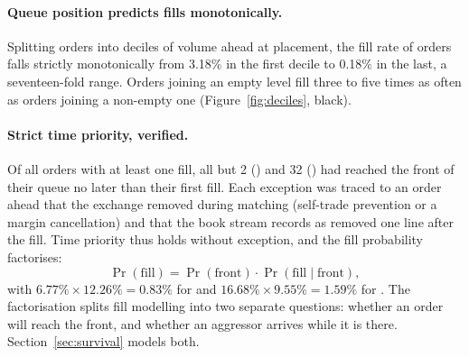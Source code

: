 \paragraph{Queue position predicts fills monotonically.}
Splitting orders into deciles of volume ahead at placement, the fill rate of
\SOL{} orders falls strictly monotonically from 3.18\% in the first decile to
0.18\% in the last, a seventeen-fold range. Orders joining an empty level fill
three to five times as often as orders joining a non-empty one
(Figure~\ref{fig:deciles}, black).

\paragraph{Strict time priority, verified.}
Of all orders with at least one fill, all but 2 (\SOL) and 32 (\BTC) had
reached the front of their queue no later than their first fill. Each exception
was traced to an order ahead that the exchange removed during matching
(self-trade prevention or a margin cancellation) and that the book stream
records as removed one line after the fill. Time priority thus holds without
exception, and the fill probability factorises:
\begin{equation}
\label{eq:factor}
\Pr(\text{fill}) = \Pr(\text{front}) \cdot \Pr(\text{fill}\mid\text{front}),
\end{equation}
with $6.77\%\times12.26\%=0.83\%$ for \SOL{} and $16.68\%\times9.55\%=1.59\%$ for
\BTC. The factorisation splits fill modelling into two separate questions:
whether an order will reach the front, and whether an aggressor arrives while it
is there. Section~\ref{sec:survival} models both.
